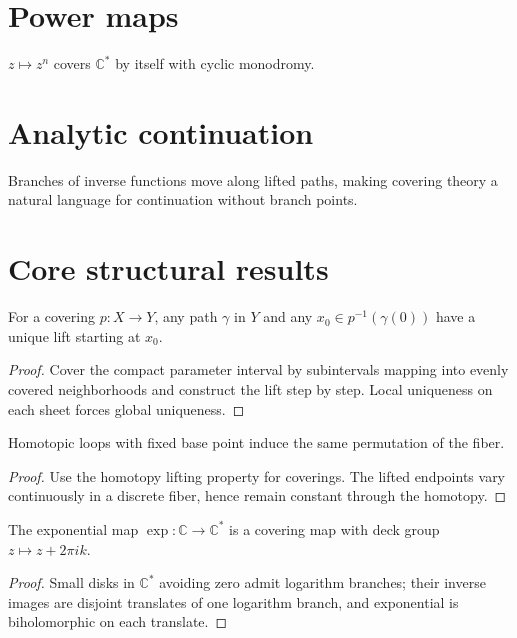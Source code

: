 \section{Power maps}
$z\mapsto z^n$ covers $\mathbb C^*$ by itself with cyclic monodromy.

\section{Analytic continuation}
Branches of inverse functions move along lifted paths, making covering theory a natural language for continuation without branch points.

\section{Core structural results}

\begin{theorem}\label{thm:iv23-01}
For a covering $p:X\to Y$, any path $\gamma$ in $Y$ and any $x_0\in p^{-1}(\gamma(0))$ have a unique lift starting at $x_0$.
\begin{proof}
Cover the compact parameter interval by subintervals mapping into evenly covered neighborhoods and construct the lift step by step. Local uniqueness on each sheet forces global uniqueness.
\end{proof}
\end{theorem}

\begin{theorem}\label{thm:iv23-02}
Homotopic loops with fixed base point induce the same permutation of the fiber.
\begin{proof}
Use the homotopy lifting property for coverings. The lifted endpoints vary continuously in a discrete fiber, hence remain constant through the homotopy.
\end{proof}
\end{theorem}

\begin{theorem}\label{thm:iv23-03}
The exponential map $\exp:\mathbb C\to\mathbb C^*$ is a covering map with deck group $z\mapsto z+2\pi i k$.
\begin{proof}
Small disks in $\mathbb C^*$ avoiding zero admit logarithm branches; their inverse images are disjoint translates of one logarithm branch, and exponential is biholomorphic on each translate.
\end{proof}
\end{theorem}

